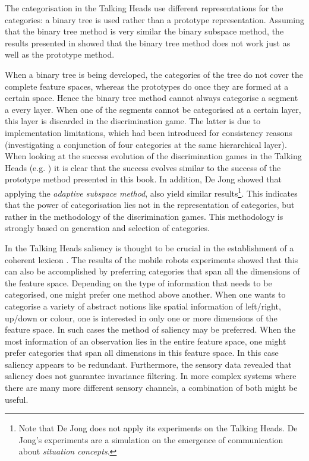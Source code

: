 The categorisation in the Talking Heads use different representations for the categories: a binary tree is used rather than a prototype representation. Assuming that the binary tree method is very similar the binary subspace method, the results presented in  showed that the binary tree method does not work just as well as the prototype method.

When a binary tree is being developed, the categories of the tree do not cover the complete feature spaces, whereas the prototypes do once they are formed at a certain space. Hence the binary tree method cannot always categorise a segment a every layer. When one of the segments cannot be categorised at a certain layer, this layer is discarded in the discrimination game. The latter is due to implementation limitations, which had been introduced for consistency reasons (investigating a conjunction of four categories at the same hierarchical layer). When looking at the success evolution of the discrimination games in the Talking Heads (e.g. \citep{steels:2000}) it is clear that the success evolves similar to the success of the prototype method presented in this book. In addition, De Jong \citep{dejongvogt:1998,dejong:2000} showed that applying  the {\em adaptive subspace method}, also yield similar results\footnote{Note that De Jong does not apply its experiments on the Talking Heads. De Jong's experiments are a simulation on the emergence of communication about {\em situation concepts}.}. This indicates that the power of categorisation lies not in the representation of categories, but rather in the methodology of the discrimination games. This methodology is strongly based on generation and selection of categories.


In the Talking Heads saliency is thought to be crucial in the establishment of a coherent lexicon \citep{steels:2000}. The results of the mobile robots experiments showed that this can also be accomplished by preferring categories that span all the dimensions of the feature space. Depending on the type of information that needs to be categorised, one might prefer one method above another. When one wants to categorise a variety of abstract notions like spatial information of left/right, up/down or colour, one is interested in only one or more dimensions of the feature space. In such cases the method of saliency may be preferred. When the most information of an observation lies in the entire feature space, one might prefer categories that span all dimensions in this feature space. In this case saliency appears to be redundant. Furthermore, the sensory data revealed that saliency does not guarantee invariance filtering. In more complex systems where there are many more different sensory channels, a combination of both might be useful.


